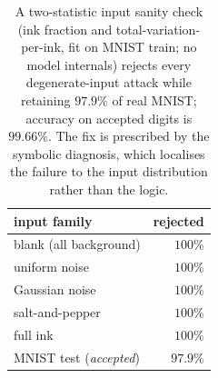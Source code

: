 \begin{table}[t]
\centering
\small
\begin{tabular}{lr}
\toprule
input family & rejected \\
\midrule
blank (all background)      & $100\%$ \\
uniform noise               & $100\%$ \\
Gaussian noise              & $100\%$ \\
salt-and-pepper             & $100\%$ \\
full ink                    & $100\%$ \\
\midrule
MNIST test (\emph{accepted}) & $97.9\%$ \\
\bottomrule
\end{tabular}
\caption{A two-statistic input sanity check (ink fraction and
total-variation-per-ink, fit on MNIST train; no model internals) rejects every
degenerate-input attack while retaining $97.9\%$ of real MNIST; accuracy on
accepted digits is $99.66\%$. The fix is prescribed by the symbolic diagnosis,
which localises the failure to the input distribution rather than the logic.}
\label{tab:attack-defense}
\end{table}
